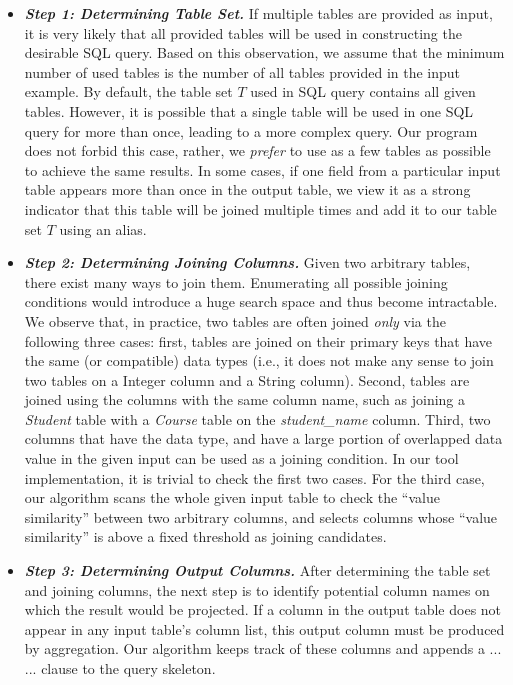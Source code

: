 \begin{itemize}

\item \textit{\textbf{Step 1: Determining Table Set.}} If multiple tables are provided as input, it is very likely that all
provided tables will be used in constructing the desirable SQL query. Based on this observation, we assume that
the minimum number of used tables is the number of all tables provided in the input example. By default, the
table set $T$ used in SQL query contains all given tables. However, it is
possible that a single table will be used in one SQL query for more than once, leading to a more complex query.
Our program does not forbid this case, rather, we \textit{prefer} to use as a few tables as possible to achieve
the same results. In some cases, if one field from a particular input table appears more than once in the
output table, we view it as a strong indicator that this table will be joined multiple times and add it to our table
set $T$ using an alias.


\item \textit{\textbf{Step 2: Determining Joining Columns. }} Given two arbitrary tables, there exist many
ways to join them. Enumerating all possible joining conditions would introduce a huge search space and thus
become intractable. We observe that, in practice, two tables are often joined \textit{only} via the following
three cases: first, tables are joined on their primary keys that have the same (or compatible) data types (i.e., it does not
make any sense to join two tables on a Integer column and a String column). Second, tables are joined
using the columns with the same column name, such as joining a \textit{Student} table with a \textit{Course} table on the
\textit{student\_name} column. Third, two columns that have the data type, and have a large portion of
overlapped data value in the given input can be used as a joining condition. In our tool implementation, it is trivial to check the first 
two cases. For the third case, our algorithm scans the whole given input table to check the ``value similarity''
between two arbitrary columns, and selects columns whose ``value similarity'' is above a fixed threshold as joining candidates.

\item \textit{\textbf{Step 3: Determining Output Columns.}} After determining the table set and joining columns,
the next step is to identify potential column names on which the result would be projected. If a
column in the output table  does not appear in any input table's column list, this output column must
be produced by aggregation. Our algorithm keeps track of these columns and appends a  ...  ...
clause to the query skeleton.

\end{itemize}

